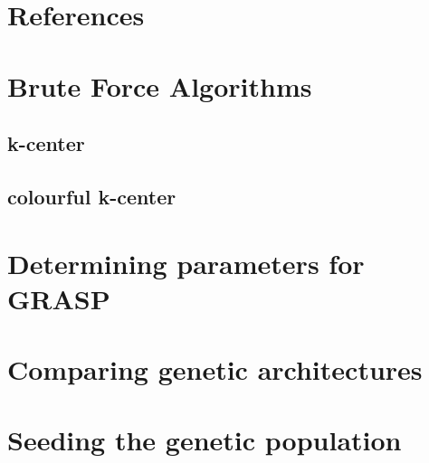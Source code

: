 \documentclass{article}
\begin{document}
\newpage
\section{References}
\sloppy{\printbibliography[heading=none]}

\appendix
\section{Brute Force Algorithms}
    \subsection{k-center}
        \label{brute-force-k-center}
        
    \subsection{colourful k-center}
        \label{brute-force-colourful-k-center}
        
        
\section{Determining parameters for GRASP}\label{appendix:grasp_param}
    
    
\section{Comparing genetic architectures}\label{appendix:genetic_architectures}
    
    
\section{Seeding the genetic population}\label{appendix:seed_population}
    

\printglossaries

\end{document}
